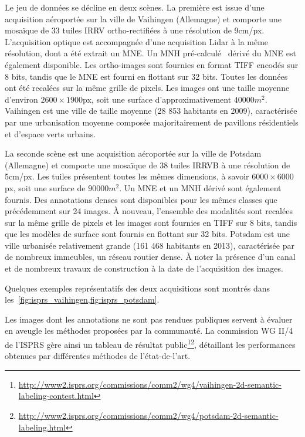Le jeu de données se décline en deux scènes. La première est issue d'une acquisition aéroportée sur la ville de Vaihingen (Allemagne) et comporte une mosaïque de 33 tuiles \gls{IRRV} ortho-rectifiées à une résolution de 9cm/px. L'acquisition optique est accompagnée d'une acquisition \gls{Lidar} à la même résolution, dont a été extrait un \gls{MNE}. Un \gls{MNH} pré-calculé~\cite{gerke_use_2015} dérivé du \gls{MNE} est également disponible. Les ortho-images sont fournies en format \gls{TIFF} encodés sur 8 bits, tandis que le \gls{MNE} est fourni en flottant sur 32 bits. Toutes les données ont été recalées sur la même grille de pixels. Les images ont une taille moyenne d'environ $2600\times1900$px, soit une surface d'approximativement $40 000m^2$. Vaihingen est une ville de taille moyenne (28 853 habitants en 2009), caractérisée par une urbanisation moyenne composée majoritairement de pavillons résidentiels et d'espace verts urbains.

La seconde scène est une acquisition aéroportée sur la ville de Potsdam (Allemagne) et comporte une mosaïque de 38 tuiles \gls{IRRVB} à une résolution de 5cm/px. Les tuiles présentent toutes les mêmes dimensions, à savoir $6000\times6000$px, soit une surface de $90 000m^2$. Un \gls{MNE} et un \gls{MNH} dérivé sont également fournis. Des annotations denses sont disponibles pour les mêmes classes que précédemment sur 24 images. À nouveau, l'ensemble des modalités sont recalées sur la même grille de pixels et les images sont fournies en \gls{TIFF} sur 8 bits, tandis que les modèles de surface sont fournis en flottant sur 32 bits. Potsdam est une ville urbanisée relativement grande (161 468 habitants en 2013), caractérisée par de nombreux immeubles, un réseau routier dense. À noter la présence d'un canal et de nombreux travaux de construction à la date de l'acquisition des images.

Quelques exemples représentatifs des deux acquisitions sont montrés dans les~\cref{fig:isprs_vaihingen,fig:isprs_potsdam}.

Les images dont les annotations ne sont pas rendues publiques servent à évaluer en aveugle les méthodes proposées par la communauté. La commission WG II/4 de l'\gls{ISPRS} gère ainsi un tableau de résultat public\footnote{\url{http://www2.isprs.org/commissions/comm2/wg4/vaihingen-2d-semantic-labeling-contest.html}}\footnote{\url{http://www2.isprs.org/commissions/comm2/wg4/potsdam-2d-semantic-labeling.html}}, détaillant les performances obtenues par différentes méthodes de l'état-de-l'art.

